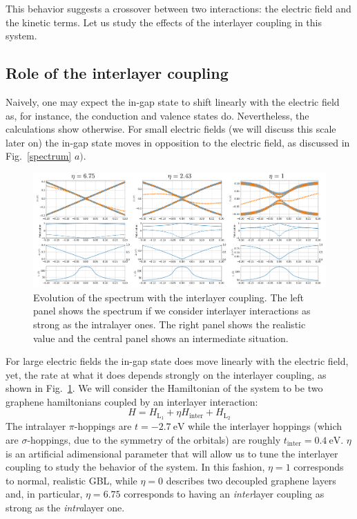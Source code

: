 This behavior suggests a crossover between two interactions: the electric field and the kinetic terms. Let us study the effects of the interlayer coupling in this system.


\subsection{Role of the interlayer coupling}
Naively, one may expect the in-gap state to shift linearly with the electric field as, for instance, the conduction and valence states do. Nevertheless, the calculations show otherwise.
For small electric fields (we will discuss this scale later on) the in-gap state moves in opposition to the electric field, as discussed in Fig.~\ref{spectrum} $a)$.
\begin{figure}[!ht!]
\centering
\includegraphics[width=\textwidth]{artlat/fig/ingap_interlayer.pdf}
\vspace{-15pt}
\caption{Evolution of the spectrum with the interlayer coupling. The left panel shows the spectrum if we consider interlayer interactions as strong as the intralayer ones. The right panel shows the realistic value and the central panel shows an intermediate situation.}
\label{ingap_interlayer}
\end{figure}
For large electric fields the in-gap state does move linearly with the electric field, yet, the rate at what it does depends strongly on the interlayer coupling, as shown in Fig.~\ref{ingap_interlayer}.
We will consider the Hamiltonian of the system to be two graphene hamiltonians coupled by an interlayer interaction:
\begin{equation}
  H = H_{\text{L}_1} + \eta H_{\text{inter}} + H_{\text{L}_2}
\end{equation}
The intralayer $\pi$-hoppings are $t=\SI{-2.7}{\eV}$ while the interlayer hoppings (which are $\sigma$-hoppings, due to the symmetry of the orbitals) are roughly $t_{\text{inter}}=\SI{0.4}{\eV}$. $\eta$ is an artificial adimensional parameter that will allow us to tune the interlayer coupling to study the behavior of the system. In this fashion, $\eta=1$ corresponds to normal, realistic GBL, while $\eta=0$ describes two decoupled graphene layers and, in particular, $\eta=6.75$ corresponds to having an \emph{inter}layer coupling as strong as the \emph{intra}layer one.\\

